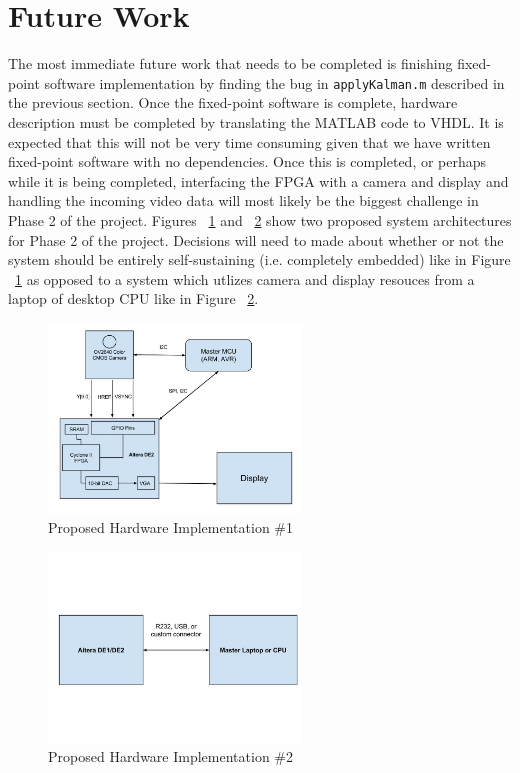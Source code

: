 \documentclass[11pt]{article} %
\begin{document}
\section{Future Work}
The most immediate future work that needs to be completed is finishing fixed-point software implementation by finding the bug in \texttt{applyKalman.m} described in the previous section. Once the fixed-point software is complete, hardware description must be completed by translating the MATLAB code to VHDL. It is expected that this will not be very time consuming given that we have written fixed-point software with no dependencies. Once this is completed, or perhaps while it is being completed, interfacing the FPGA with a camera and display and handling the incoming video data will most likely be the biggest challenge in Phase 2 of the project. Figures ~\ref{fig:hw1} and ~\ref{fig:hw2} show two proposed system architectures for Phase 2 of the project. Decisions will need to made about whether or not the system should be entirely self-sustaining (i.e. completely embedded) like in Figure ~\ref{fig:hw1} as opposed to a system which utlizes camera and display resouces from a laptop of desktop CPU like in Figure ~\ref{fig:hw2}.
\begin{figure}[h]
\centering
\includegraphics[width=0.6\textwidth]{./images/hw_layout_1.jpg}
\caption{Proposed Hardware Implementation \#1}
\label{fig:hw1}    
\end{figure}
\begin{figure}[h]
\centering
\includegraphics[width=0.6\textwidth]{./images/hw_layout_2.jpg}
\caption{Proposed Hardware Implementation \#2}
\label{fig:hw2}    
\end{figure}
\end{document}
